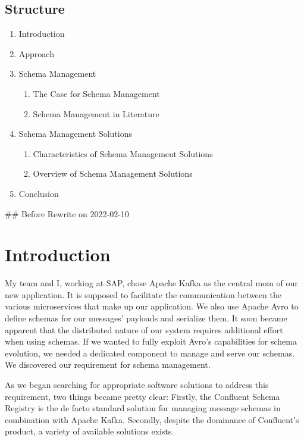 \subsection{Structure}

\begin{enumerate}
  \item Introduction
  \item Approach
  \item Schema Management
        \begin{enumerate}
          \item The Case for Schema Management
          \item Schema Management in Literature
        \end{enumerate}
  \item Schema Management Solutions
        \begin{enumerate}
          \item Characteristics of Schema Management Solutions
          \item Overview of Schema Management Solutions
        \end{enumerate}
  \item Conclusion
\end{enumerate}

## Before Rewrite on 2022-02-10

\section{Introduction}\label{sec:introduction}

My team and I, working at SAP, chose Apache Kafka as the central \gls{mom} of our new application.
It is supposed to facilitate the communication between the various microservices that make up our application.
We also use Apache Avro to define schemas for our messages' payloads and serialize them.
It soon became apparent that the distributed nature of our system requires additional effort when using schemas.
If we wanted to fully exploit Avro's capabilities for schema evolution, we needed a dedicated component to manage and serve our schemas.
We discovered our requirement for schema management.

As we began searching for appropriate software solutions to address this requirement, two things became pretty clear: Firstly, the Confluent Schema Registry is the de facto standard solution for managing message schemas in combination with Apache Kafka. Secondly, despite the dominance of Confluent's product, a variety of available solutions exists.

